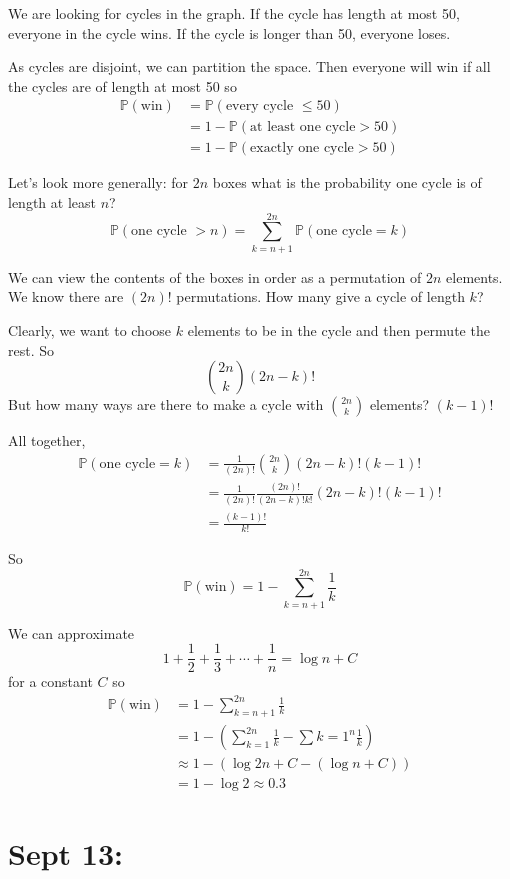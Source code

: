 \documentclass[12pt]{report}
\renewcommand{\P}{\mathbb{P}}
\begin{document}
    We are looking for cycles in the graph. If the cycle has length at most 50, everyone in the cycle wins. If the cycle is longer than 50, everyone loses.
    
    As cycles are disjoint, we can partition the space. Then everyone will win if all the cycles are of length at most 50 so 
    \begin{align*}
        \P(\text{win}) &= \P(\text{every cycle } \leq 50)\\
        &= 1 - \P(\text{at least one cycle} > 50)\\ 
        &= 1 - \P(\text{exactly one cycle} > 50)
    \end{align*}

    Let's look more generally: for $2n$ boxes what is the probability one cycle is of length at least $n$?
    \[\P(\text{one cycle } > n) = \sum_{k={n+1}}^{2n} \P(\text{one cycle} = k)\]

    We can view the contents of the boxes in order as a permutation of $2n$ elements. We know there are $(2n)!$ permutations. How many give a cycle of length $k$?

    Clearly, we want to choose $k$ elements to be in the cycle and then permute the rest. So
    \[\binom{2n}{k}(2n - k)!\]
    But how many ways are there to make a cycle with $\binom{2n}{k}$ elements? $(k-1)!$ 

    All together, 
    \begin{align*}
        \P(\text{one cycle} = k) &= \frac{1}{(2n)!} \binom{2n}{k}(2n - k)!(k-1)!\\ 
        &= \frac{1}{(2n)!}\frac{(2n)!}{(2n -k)!k!} (2n-k)!(k-1)!\\ 
        &= \frac{(k-1)!}{k!}
    \end{align*}

    So 
    \[\P(\text{win}) = 1 - \sum_{k=n+1}^{2n} \frac{1}{k}\]

    We can approximate 
    \[1 + \frac{1}{2} + \frac{1}{3} + \cdots + \frac{1}{n} = \log n + C\]
    for a constant $C$ so 
    \begin{align*}
        \P(\text{win}) &= 1 - \sum_{k=n+1}^{2n} \frac{1}{k}\\ 
        &= 1 - \left(\sum_{k=1}^{2n} \frac{1}{k} - \sum{k=1}^n \frac{1}{k}\right)\\ 
        &\approx 1 - (\log 2n + C - (\log n + C))\\ 
        &= 1 - \log 2 \approx 0.3
    \end{align*}

\section{Sept 13:}
\end{document}

